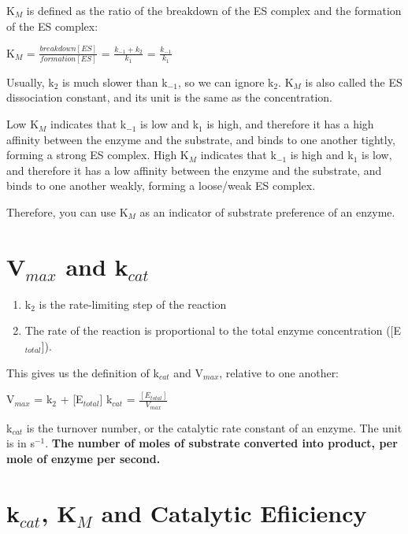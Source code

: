 \documentclass[a4paper, 12pt]{report}
\begin{document}
K$_M$ is defined as the ratio of the breakdown of the ES complex and the formation of the ES complex:

\begin{center}
\large{K$_M$ = $\frac{breakdown[ES]}{formation[ES]}$ = $\frac{k_{-1} + k_2}{k_1}$ = $\frac{k_{-1}}{k_1}$}
\end{center}

Usually, k$_2$ is much slower than k$_{-1}$, so we can ignore k$_2$.
K$_M$ is also called the ES dissociation constant, and its unit is the same as the concentration.

Low K$_M$ indicates that k$_{-1}$ is low and k$_1$ is high, and therefore it has a high affinity between the enzyme and the substrate, and binds to one another tightly, forming a strong ES complex.
High K$_M$ indicates that k$_{-1}$ is high and k$_1$ is low, and therefore it has a low affinity between the enzyme and the substrate, and binds to one another weakly, forming a loose/weak ES complex.

Therefore, you can use K$_M$ as an indicator of substrate preference of an enzyme.

\section{V$_{max}$ and k$_{cat}$}

\begin{center}
\end{center}

\begin{enumerate}
\item k$_2$ is the rate-limiting step of the reaction
\item The rate of the reaction is proportional to the total enzyme concentration ([E$_{total}$]).
\end{enumerate}

This gives us the definition of k$_{cat}$ and V$_{max}$, relative to one another:

\begin{center}
V$_{max}$ = k$_2$ + [E$_{total}$] \ch{->} k$_{cat}$ = $\frac{[E_{total}]}{V_{max}}$
\end{center}

k$_{cat}$ is the turnover number, or the catalytic rate constant of an enzyme.
The unit is in s$^{-1}$.
\textbf{The number of moles of substrate converted into product, per mole of enzyme per second.}

\section{k$_{cat}$, K$_M$ and Catalytic Efiiciency}
\end{document}
